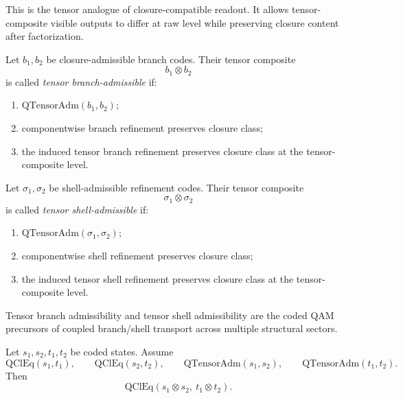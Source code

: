 \begin{remark}
This is the tensor analogue of closure-compatible readout. It allows tensor-composite visible outputs to differ at raw level while preserving closure content after factorization.
\end{remark}

\begin{definition}
Let $b_1,b_2$ be closure-admissible branch codes. Their tensor composite
\[
b_1\otimes b_2
\]
is called \emph{tensor branch-admissible} if:
\begin{enumerate}
\item $\mathrm{QTensorAdm}(b_1,b_2)$;
\item componentwise branch refinement preserves closure class;
\item the induced tensor branch refinement preserves closure class at the tensor-composite level.
\end{enumerate}
\end{definition}

\begin{definition}
Let $\sigma_1,\sigma_2$ be shell-admissible refinement codes. Their tensor composite
\[
\sigma_1\otimes \sigma_2
\]
is called \emph{tensor shell-admissible} if:
\begin{enumerate}
\item $\mathrm{QTensorAdm}(\sigma_1,\sigma_2)$;
\item componentwise shell refinement preserves closure class;
\item the induced tensor shell refinement preserves closure class at the tensor-composite level.
\end{enumerate}
\end{definition}

\begin{remark}
Tensor branch admissibility and tensor shell admissibility are the coded QAM precursors of coupled branch/shell transport across multiple structural sectors.
\end{remark}

\begin{proposition}
Let $s_1,s_2,t_1,t_2$ be coded states. Assume
\[
\mathrm{QClEq}(s_1,t_1),
\qquad
\mathrm{QClEq}(s_2,t_2),
\qquad
\mathrm{QTensorAdm}(s_1,s_2),
\qquad
\mathrm{QTensorAdm}(t_1,t_2).
\]
Then
\[
\mathrm{QClEq}(s_1\otimes s_2,\ t_1\otimes t_2).
\]
\end{proposition}


